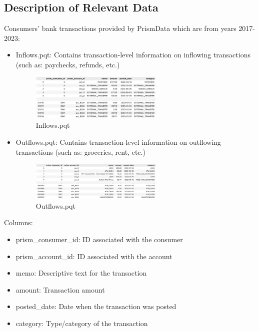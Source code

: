 \documentclass[12pt,letterpaper]{article}
\begin{document}
\subsection{Description of Relevant Data}
{Consumers' bank transactions provided by PrismData which are from years 2017-2023:}
\begin{itemize}
    \item {Inflows.pqt: Contains transaction-level information on inflowing transactions (such as: paychecks, refunds, etc.)}
    \begin{figure}[H]
        \centering
        \includegraphics[width=0.6\textwidth]{pngs/inflows.png}
        \caption{Inflows.pqt}
        \label{fig:enter-label}
    \end{figure}
    
    \item {Outflows.pqt: Contains transaction-level information on outflowing transactions (such as: groceries, rent, etc.)}
    \begin{figure}[H]
        \centering
        \includegraphics[width=0.6\textwidth]{pngs/outflows.png}
        \caption{Outflows.pqt}
        \label{fig:enter-label}
    \end{figure}
    
\end{itemize}
Columns:
\begin{itemize}
    \item {prism\_consumer\_id: ID associated with the consumer}
    \item {prism\_account\_id: ID associated with the account}
    \item {memo: Descriptive text for the transaction}
    \item {amount: Transaction amount}
    \item {posted\_date: Date when the transaction was posted}
    \item {category: Type/category of the transaction}
\end{itemize}
\end{document}
